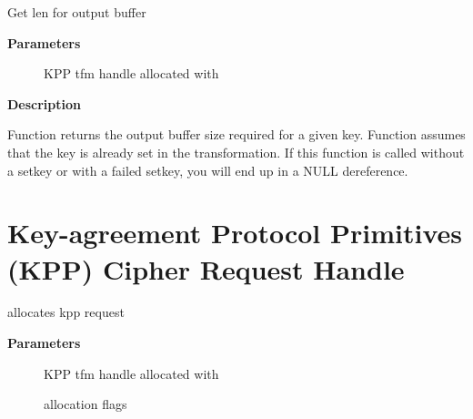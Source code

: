 \documentclass[a4paper,8pt,english]{sphinxmanual}
\begin{document}
\begin{fulllineitems}
\label{crypto/api-kpp:c.crypto_kpp_maxsize}
Get len for output buffer

\end{fulllineitems}


\textbf{Parameters}
\begin{description}
\item[{}] \leavevmode
KPP tfm handle allocated with {\hyperref[crypto/api\string-kpp:c.crypto_alloc_kpp]{}}

\end{description}

\textbf{Description}

Function returns the output buffer size required for a given key.
Function assumes that the key is already set in the transformation. If this
function is called without a setkey or with a failed setkey, you will end up
in a NULL dereference.


\section{Key-agreement Protocol Primitives (KPP) Cipher Request Handle}
\label{crypto/api-kpp:key-agreement-protocol-primitives-kpp-cipher-request-handle}

\begin{fulllineitems}
\label{crypto/api-kpp:c.kpp_request_alloc}
allocates kpp request

\end{fulllineitems}


\textbf{Parameters}
\begin{description}
\item[{}] \leavevmode
KPP tfm handle allocated with {\hyperref[crypto/api\string-kpp:c.crypto_alloc_kpp]{}}

\item[{}] \leavevmode
allocation flags

\end{description}
\end{document}
